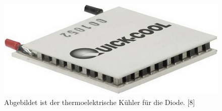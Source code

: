 \begin{figure}[H]
    \centering
    \includegraphics[scale=0.5]{98_images/peltier_modul.PNG}
    \caption{Abgebildet ist der thermoelektrische Kühler für die Diode. [8]}
    \label{fig:tec_di_hw}
\end{figure}

